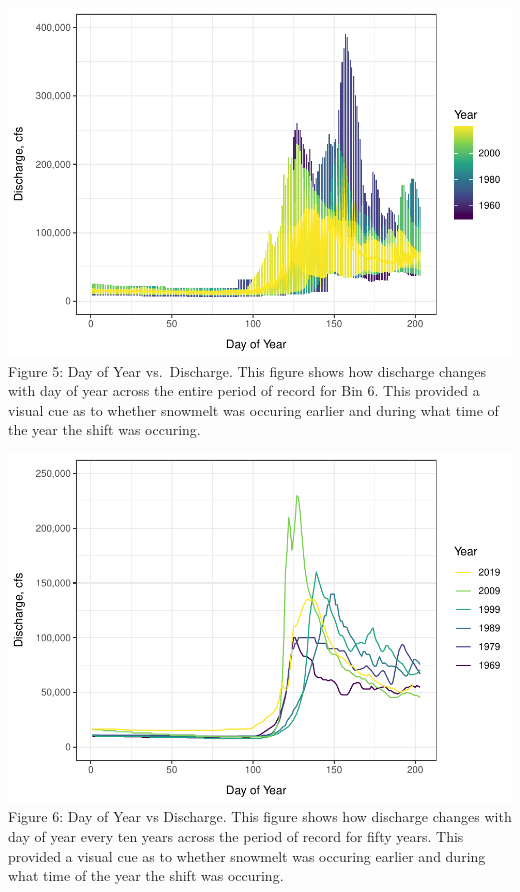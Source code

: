 \documentclass[12pt,]{article}
\begin{document}
\includegraphics{Project_Report_v2_files/figure-latex/Snowmelt Day of Year Exploratory Graph 3-1.pdf}
Figure 5: Day of Year vs.~Discharge. This figure shows how discharge
changes with day of year across the entire period of record for Bin 6.
This provided a visual cue as to whether snowmelt was occuring earlier
and during what time of the year the shift was occuring.

\includegraphics{Project_Report_v2_files/figure-latex/Snowmelt Day of Year Exploratory Graph 4-1.pdf}
Figure 6: Day of Year vs Discharge. This figure shows how discharge
changes with day of year every ten years across the period of record for
fifty years. This provided a visual cue as to whether snowmelt was
occuring earlier and during what time of the year the shift was
occuring.

\newpage
\end{document}
